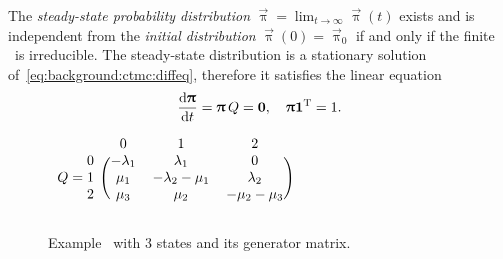 The \emph{steady-state probability distribution}
$\vec{\uppi} = \lim_{t \to \infty} \vec{\uppi}(t)$ exists and is
independent from the \emph{initial distribution}
$\vec{\uppi}(0) = \vec{\uppi}_0$ if and only if the finite \CTMC\ is
irreducible. The steady-state distribution is a stationary solution
of~\cref{eq:background:ctmc:diffeq}, therefore it satisfies the linear
equation
\begin{equation}
  \label{eq:background:ctmc:steadystate}
  \frac{\mathrm{d} \bm{\mathrm{\uppi}}}{\mathrm{d} t} = \bm{\mathrm{\uppi}} \, Q = \bm{\mathrm{0}},
  \quad \bm{\mathrm{\uppi}} \bm{\mathrm{1}}^{\mathrm{T}} = 1 \text.
\end{equation}

\begin{figure}
  \begin{minipage}{.49\linewidth}
    \centering
  \end{minipage}
  \begin{minipage}{.49\linewidth}
    \centering
    $\begin{blockarray}{rccc}
      & 0 & 1 & 2 \\
      \begin{block}{r(ccc)}
        0 & -\lambda_1 & \lambda_1 & 0 \\
        Q = 1 & \mu_1 & -\lambda_2 - \mu_1 & \lambda_2 \\
        2 & \mu_3 & \mu_2 & -\mu_2 - \mu_3 \\
      \end{block}
    \end{blockarray}$
    \vspace{0.5cm}
  \end{minipage}
  \caption{Example \CTMC\ with 3 states and its generator matrix.}
  \label{fig:background:ctmc:repair}
\end{figure}

